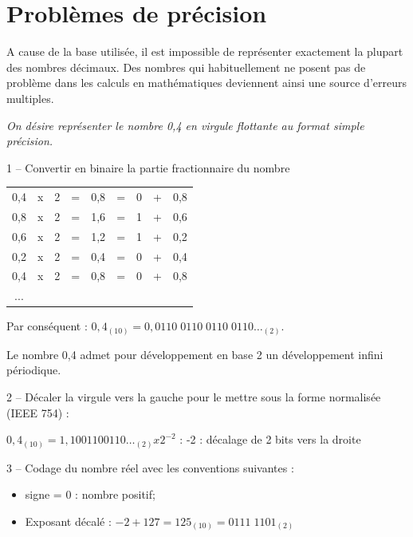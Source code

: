 \documentclass[10pt,fleqn]{article} %
\begin{document}


\section{Problèmes de précision}

A cause de la base utilisée, il est impossible de représenter exactement la plupart des nombres décimaux. Des nombres qui habituellement ne posent pas de problème dans les calculs en mathématiques deviennent ainsi une source d’erreurs multiples.

\begin{exemple}
\textit{On désire représenter le nombre 0,4 en virgule flottante au format simple précision.}

1 -- Convertir en binaire la partie fractionnaire du nombre


\begin{center}
\begin{tabular}{ccccccccc}
\cline{7-7}
0,4 & x & 2 & = & 0,8 & = & \multicolumn{1}{|c|}{0} & + & 0,8 \\
0,8 & x & 2 & = & 1,6 & = & \multicolumn{1}{|c|}{1} & + & 0,6 \\
0,6 & x & 2 & = & 1,2 & = & \multicolumn{1}{|c|}{1} & + & 0,2 \\
0,2 & x & 2 & = & 0,4 & = & \multicolumn{1}{|c|}{0} & + & 0,4 \\
\cline{7-7}
0,4 & x & 2 & = & 0,8 & = & 0 & + & 0,8 \\
...
\end{tabular}
\end{center}
Par conséquent : $0,4_{(10)} = 0,0110\;0110\; 0110\; 0110 … _{(2)}$.

Le nombre 0,4 admet pour développement en base 2 un développement infini périodique.

2 -- Décaler la virgule vers la gauche pour le mettre sous la forme normalisée (IEEE 754) :
 
$0,4_{(10)} = 1,10 0110 0110 … _{(2)} x 2^{- 2}$ : -2 : décalage de 2 bits vers la droite

3 -- Codage du nombre réel avec les conventions suivantes : 
\begin{itemize}
\item signe = 0 : nombre positif;
\item Exposant décalé :	$- 2 + 127 = 125_{(10)} = 0111\; 1101_{(2)}$
\end{itemize}


\end{exemple}
\end{document}
